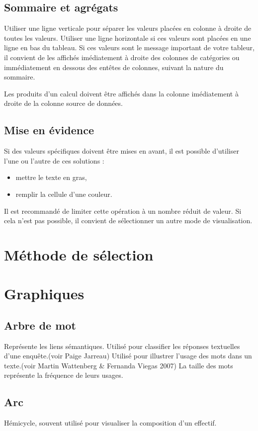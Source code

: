 \documentclass[a4paper,12pt]{article}
\begin{document}
\begin{multicols}{2}
\subsection*{Sommaire et agrégats}
\label{sec:orgb072c91}
Utiliser une ligne verticale pour séparer les valeurs placées en colonne à droite de toutes les valeurs.
Utiliser une ligne horizontale si ces valeurs sont placées en une ligne en bas du tableau.
Si ces valeurs sont le message important de votre tableur, il convient de les affichés imédiatement à droite des colonnes de catégories ou immédiatement en dessous des entêtes de colonnes, suivant la nature du sommaire.

Les produits d'un calcul doivent être affichés dans la colonne imédiatement à droite de la colonne source de données.
\subsection*{Mise en évidence}
\label{sec:orgbde12c8}
Si des valeurs spécifiques doivent être mises en avant, il est possible d'utiliser l'une ou l'autre de ces solutions :
\begin{itemize}
\item mettre le texte en gras,
\item remplir la cellule d'une couleur.
\end{itemize}
Il est recommandé de limiter cette opération à un nombre réduit de valeur. Si cela n'est pas possible, il convient de sélectionner un autre mode de visualisation.
\section*{Méthode de sélection}
\label{sec:orga935006}

\section*{Graphiques}
\label{sec:orge948702}
\subsection*{Arbre de mot}
\label{sec:orge05241b}
Représente les liens sémantiques. Utilisé pour classifier les réponses textuelles d'une enquête.(voir Paige Jarreau) Utilisé pour illustrer l'usage des mots dans un texte.(voir Martin Wattenberg \& Fernanda Viegas 2007) La taille des mots représente la fréquence de leurs usages. \autocite{jonathanschwabishQualitative2021}
\subsection*{Arc}
\label{sec:orga3cac03}
Hémicycle, souvent utilisé pour visualiser la composition d'un effectif. \autocite{alansmithLexiqueVisuel}

\end{multicols}
\end{document}
